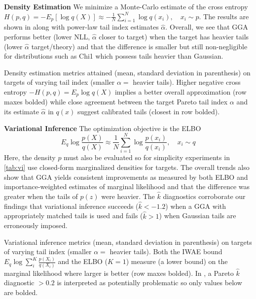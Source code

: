 \documentclass[../thesis.tex]{subfiles}
\begin{document}
\textbf{Density Estimation} We minimize a Monte-Carlo estimate of the cross entropy $H(p,q) = -E_p[\log q(X)] \approx -\frac{1}{N} \sum_{i=1}^N \log q(x_i),\quad x_i \sim p$.
The results are shown in  along with power-law tail index estimates \citep{clauset2009power} $\hat\alpha$.
Overall, we see that GGA performs better (lower NLL, $\hat\alpha$ closer to target) when the target
has heavier tails (lower $\hat\alpha$ target/theory) and that the difference is smaller but still non-negligible
for distributions such as Chi1 which possess tails heavier than Gaussian.

\begin{table}[h]
  \centering
  \caption{Density estimation metrics attained (mean, standard deviation in parenthesis)
    on targets of varying tail index (smaller $\alpha =$ heavier tails).
    Higher negative cross entropy $-H(p,q) = E_p \log q(X)$ implies a better overall approximation (row maxes bolded)
    while close agreement between the target Pareto tail index $\alpha$ \citep{clauset2009power}
    and its estimate $\hat\alpha$ in $q(x)$ suggest calibrated tails (closest in row bolded).
  }
  \label{tab:de}
  
\end{table}

\textbf{Variational Inference} The optimization objective is the ELBO
\[
  E_q \log \frac{p(X)}{q(X)} \approx \frac{1}{N} \sum_{i=1}^N \log \frac{p(x_i)}{q(x_i)},\quad x_i \sim q
\]
Here, the density $p$ must also be evaluated so for simplicity
experiments in \cref{tab:vi} use closed-form marginalized densities for targets.
The overall trends also show that GGA yields consistent improvements as measured by both ELBO and importance-weighted
estimates of marginal likelihood and that the difference was greater when the tails of $p(z)$ were heavier.
The $\hat{k}$ diagnostics \citep{yao2018yes} corroborate our findings that variational inference succeeds
($\hat{k} < -1.2$) when a GGA with appropriately matched tails is used and fails ($\hat{k} > 1$) when
Gaussian tails are erroneously imposed.

\begin{table}[h]
  \centering
  \caption{Variational inference metrics (mean, standard deviation in parenthesis)
    on targets of varying tail index (smaller $\alpha =$ heavier tails). Both the IWAE bound $E_q \log \sum_i^K \frac{p(X_i)}{q(X_i)}$ and the ELBO ($K=1$) measure (a lower bound) on the marginal likelihood where larger is better (row maxes bolded). In \citet{yao2018yes},
    a Pareto $\hat{k}$ diagnostic $> 0.2$ is interpreted as potentially problematic so only values below are bolded.}
  \label{tab:vi}
  \small
\end{table}
\end{document}
